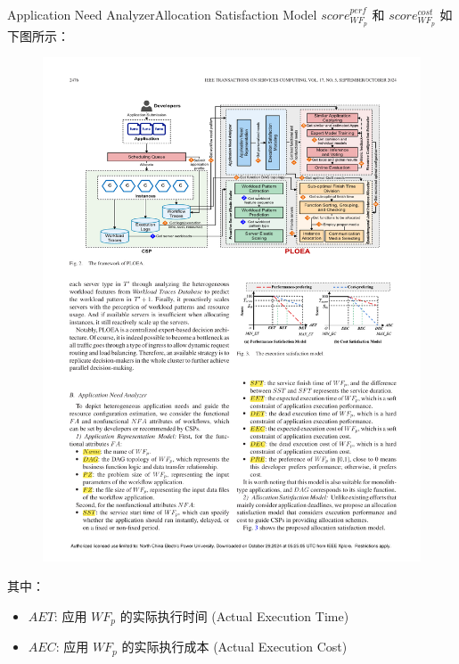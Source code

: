 \documentclass[aspectratio=169]{beamer}
\begin{document}
\begin{frame}{Application Need Analyzer}{Allocation Satisfaction Model}
  $score_{WF_p}^{perf}$ 和 $score_{WF_p}^{cost}$ 如下图所示：
  \begin{figure}
    \centering
    \includegraphics[height=0.5\textheight]{img/method/satisfaction-model.pdf}
  \end{figure}
  其中：
  \begin{itemize}
    \item $AET$: 应用 $WF_p$ 的实际执行时间 (Actual Execution Time)
    \item $AEC$: 应用 $WF_p$ 的实际执行成本 (Actual Execution Cost)
  \end{itemize}
\end{frame}
\end{document}
